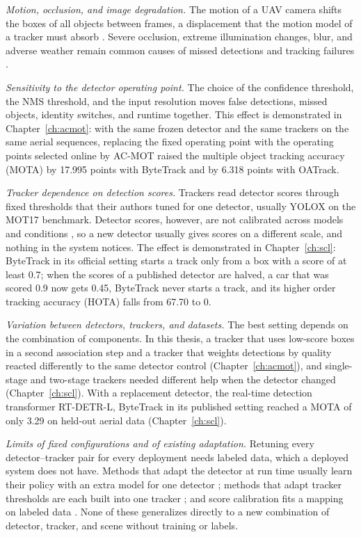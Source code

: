 \emph{Motion, occlusion, and image degradation.} The motion of a UAV camera shifts the boxes of all objects between frames, a displacement that the motion model of a tracker must absorb \cite{liu2022uavmot}. Severe occlusion, extreme illumination changes, blur, and adverse weather remain common causes of missed detections and tracking failures \cite{ismail2026realtime,chae2024radar}.

\emph{Sensitivity to the detector operating point.} The choice of the confidence threshold, the NMS threshold, and the input resolution moves false detections, missed objects, identity switches, and runtime together. This effect is demonstrated in Chapter~\ref{ch:acmot}: with the same frozen detector and the same trackers on the same aerial sequences, replacing the fixed operating point with the operating points selected online by AC-MOT raised the multiple object tracking accuracy (MOTA) by 17.995 points with ByteTrack and by 6.318 points with OATrack.

\emph{Tracker dependence on detection scores.} Trackers read detector scores through fixed thresholds that their authors tuned for one detector, usually YOLOX \cite{ge2021yolox} on the MOT17 benchmark. Detector scores, however, are not calibrated across models and conditions \cite{guo2017calibration,kuppers2020detcalib}, so a new detector usually gives scores on a different scale, and nothing in the system notices. The effect is demonstrated in Chapter~\ref{ch:scl}: ByteTrack in its official setting starts a track only from a box with a score of at least 0.7; when the scores of a published detector are halved, a car that was scored 0.9 now gets 0.45, ByteTrack never starts a track, and its higher order tracking accuracy (HOTA) \cite{luiten2021hota} falls from 67.70 to 0.

\emph{Variation between detectors, trackers, and datasets.} The best setting depends on the combination of components. In this thesis, a tracker that uses low-score boxes in a second association step and a tracker that weights detections by quality reacted differently to the same detector control (Chapter~\ref{ch:acmot}), and single-stage and two-stage trackers needed different help when the detector changed (Chapter~\ref{ch:scl}). With a replacement detector, the real-time detection transformer RT-DETR-L, ByteTrack in its published setting reached a MOTA of only 3.29 on held-out aerial data (Chapter~\ref{ch:scl}).

\emph{Limits of fixed configurations and of existing adaptation.} Retuning every detector--tracker pair for every deployment needs labeled data, which a deployed system does not have. Methods that adapt the detector at run time usually learn their policy with an extra model for one detector \cite{han2022dynamic,chin2019adascale,xu2020approxdet}; methods that adapt tracker thresholds are each built into one tracker \cite{ma2023adaptivebytetrack,shim2024adaptrack,act2026adaptive}; and score calibration fits a mapping on labeled data \cite{kuppers2020detcalib}. None of these generalizes directly to a new combination of detector, tracker, and scene without training or labels.

